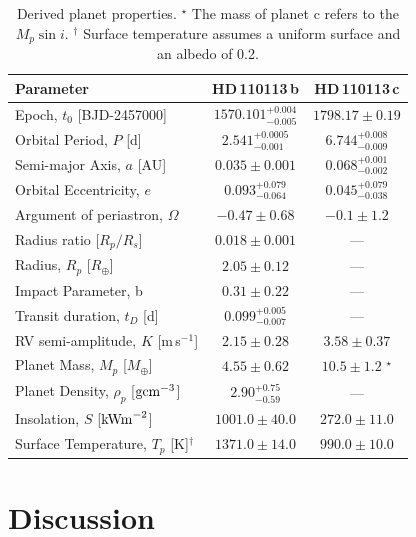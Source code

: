 \documentclass[fleqn,usenatbib]{mnras}
\newcommand{\ms}{m\,s$^{-1}$}
\newcommand{\Ttzerozero}{ $ 1570.101^{+0.004}_{-0.005} $ }
\newcommand{\Ttzeroone}{ $ 1798.17 \pm 0.19 $ }
\newcommand{\TKzero}{ $ 2.15 \pm 0.28 $ }
\newcommand{\TKone}{ $ 3.58 \pm 0.37 $ }
\newcommand{\TPzero}{ $ 2.541^{+0.0005}_{-0.001} $ }
\newcommand{\TPone}{ $ 6.744^{+0.008}_{-0.009} $ }
\newcommand{\Tecczero}{ $ 0.093^{+0.079}_{-0.064} $ }
\newcommand{\Teccone}{ $ 0.045^{+0.079}_{-0.038} $ }
\newcommand{\Tomegazero}{ $ -0.47 \pm 0.68 $ }
\newcommand{\Tomegaone}{ $ -0.1 \pm 1.2 $ }
\newcommand{\TMpzero}{ $ 4.55 \pm 0.62 $ }
\newcommand{\TMpone}{ $ 10.5 \pm 1.2 $ }
\newcommand{\Tror}{ $ 0.018 \pm 0.001 $ }
\newcommand{\Trpl}{ $ 2.05 \pm 0.12 $ }
\newcommand{\Tb}{ $ 0.31 \pm 0.22 $ }
\newcommand{\Trhopgcmthree}{ $ 2.90^{+0.75}_{-0.59} $ }
\newcommand{\Tsmazero}{ $ 0.035 \pm 0.001 $ }
\newcommand{\Tsmaone}{ $ 0.068^{+0.001}_{-0.002} $ }
\newcommand{\TSinzero}{ $ 1001.0 \pm 40.0 $ }
\newcommand{\TSinone}{ $ 272.0 \pm 11.0 $ }
\newcommand{\TTsurfpzero}{ $ 1371.0 \pm 14.0 $ }
\newcommand{\TTsurfpone}{ $ 990.0 \pm 10.0 $ }
\newcommand{\Ttdurzero}{ $ 0.099^{+0.005}_{-0.007} $ }
\newcommand{\Tplanet}{HD\,110113\,b}
\newcommand{\Tplanetc}{HD\,110113\,c}
\begin{document}
\begin{table}
	\centering
	\label{tab:derived_pars}
        \begin{tabular}{lcc}
        \hline
        \hline
        Parameter & \Tplanet{} & \Tplanetc{}\\
        \hline
        \hline
        Epoch, $t_0$ [BJD-2457000] &  \Ttzerozero{}  &  \Ttzeroone  \\
        Orbital Period, $P$ [d] &  \TPzero{}  &  \TPone{} \\
        Semi-major Axis, $a$ [AU] &  \Tsmazero{}  &  \Tsmaone{}  \\
        Orbital Eccentricity, $e$ &  \Tecczero{}  & \Teccone{}  \\
        Argument of periastron, $\Omega$ &  \Tomegazero{} &  \Tomegaone{}  \\
        Radius ratio [$R_p/R_s$] &  \Tror{}  & --- \\
        Radius, $R_p$ [$R_\oplus$] &  \Trpl{}  & --- \\
        Impact Parameter, b &  \Tb{}  & --- \\
        Transit duration, $t_D$ [d] &  \Ttdurzero{}  & --- \\
        RV semi-amplitude, $K$ [\ms{}] &  \TKzero{}  &  \TKone{}  \\
        Planet Mass, $M_p$ [$M_\oplus$] &  \TMpzero{}  &  \TMpone{}$^{\star}$  \\
        Planet Density, $\rho_p$ [${\rm gcm}^{-3}$] &  \Trhopgcmthree{}  & --- \\
        Insolation, $S$ [${\rm kW m}^{-2}$] &  \TSinzero{} &  \TSinone{} \\
        Surface Temperature, $T_p$ [K]$^{\dagger{}}$ & \TTsurfpzero{}  &  \TTsurfpone{} \\
        \hline
        \hline
        \end{tabular}
	\caption{Derived planet properties. $^{\star}$ The mass of planet c refers to the $M_p\sin{i}$. $^{\dagger{}}$ Surface temperature assumes a uniform surface and an albedo of 0.2.}
\end{table}

\section{Discussion}\label{sect:discus}
\end{document}

